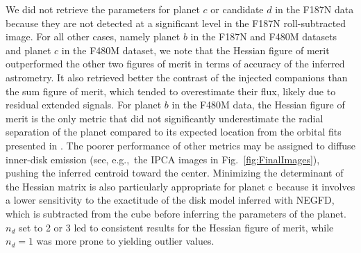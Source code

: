 \documentclass[longauth]{aa}
\begin{document}
\begin{appendix}
We did not retrieve the parameters for planet $c$ or candidate $d$ in the F187N data because they are not detected at a significant level in %
the F187N roll-subtracted image. 
For all other cases, namely planet $b$ in the F187N and F480M datasets and planet $c$ in the F480M dataset, we note that the Hessian figure of merit outperformed the other two figures of merit in terms of accuracy of the inferred astrometry. It also retrieved better the contrast of the injected companions than the sum figure of merit, which tended to overestimate their flux, likely due to residual extended signals.
For planet $b$ in the F480M data, the Hessian figure of merit is the only metric that did not significantly underestimate the radial separation of the planet compared to its expected location from the orbital fits presented in \citet{Wang2021}. The poorer performance of other metrics may be assigned to diffuse inner-disk emission (see, e.g.,~the IPCA images in Fig.~\ref{fig:FinalImages}), pushing the inferred centroid toward the center. Minimizing the determinant of the Hessian matrix is also particularly appropriate for planet c because it involves a lower sensitivity to the exactitude of the disk model inferred with NEGFD, which is subtracted from the cube before inferring the parameters of the planet. $n_d$ set to 2 or 3 led to consistent results for the Hessian figure of merit, while $n_d = 1$ was more prone to yielding outlier values.

\end{appendix}
\end{document}
